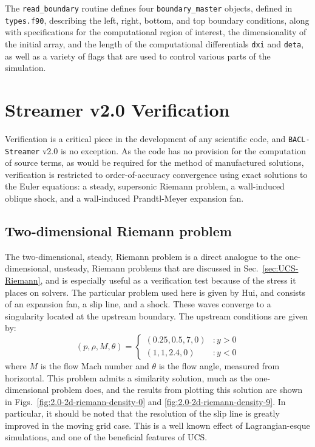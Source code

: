 The {\tt read\_boundary} routine defines four {\tt boundary\_master} objects, defined in {\tt types.f90}, describing the left, right, bottom, and top boundary conditions, along with specifications for the computational region of interest, the dimensionality of the initial array, and the length of the computational differentials {\tt dxi} and {\tt deta}, as well as a variety of flags that are used to control various parts of the simulation. 

\section{Streamer v2.0 Verification}
\label{sec:ver-Str2-exact}

Verification is a critical piece in the development of any scientific code, and {\tt BACL-Streamer} v2.0 is no exception. As the code has no provision for the computation of source terms, as would be required for the method of manufactured solutions, verification is restricted to order-of-accuracy convergence using exact solutions to the Euler equations: a steady, supersonic Riemann problem, a wall-induced oblique shock, and a wall-induced Prandtl-Meyer expansion fan. 

\subsection{Two-dimensional Riemann problem}
\label{sec:ver-Str2-2dR}
The two-dimensional, steady, Riemann problem is a direct analogue to the one-dimensional, unsteady, Riemann problems that are discussed in Sec.~\ref{sec:UCS-Riemann}, and is especially useful as a verification test because of the stress it places on solvers. The particular problem used here is given by Hui\cite{Hui1999}, and consists of an expansion fan, a slip line, and a shock. These waves converge to a singularity located at the upstream boundary. The upstream conditions are given by:
\begin{equation}
\left(p,\rho,M,\theta\right)=\left\{
\begin{array}{lr}
\left(0.25,0.5,7,0\right) & :y>0\\
\left(1,1,2.4,0\right) & :y<0
\end{array}
\right.
\end{equation}
where $M$ is the flow Mach number and $\theta$ is the flow angle, measured from horizontal. This problem admits a similarity solution, much as the one-dimensional problem does, and the results from plotting this solution are shown in Figs.~\ref{fig:2.0-2d-riemann-density-0} and \ref{fig:2.0-2d-riemann-density-9}. In particular, it should be noted that the resolution of the slip line is greatly improved in the moving grid case. This is a well known effect of Lagrangian-esque simulations, and one of the beneficial features of UCS. 

